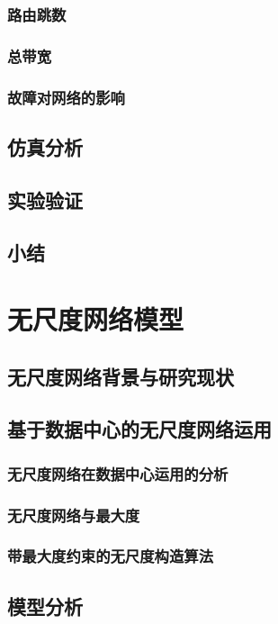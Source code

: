 \documentclass[master]{njuthesis}
\begin{document}
\subsection{路由跳数}
\Blindtext
\subsection{总带宽}
\Blindtext
\subsection{故障对网络的影响}
\Blindtext
\section{仿真分析}
\Blindtext
\section{实验验证}
\Blindtext
\section{小结}
\blindtext

\chapter{无尺度网络模型}\label{chapter_scalefree}
\section{无尺度网络背景与研究现状}
\Blindtext
\section{基于数据中心的无尺度网络运用}
\subsection{无尺度网络在数据中心运用的分析}
\Blindtext
\subsection{无尺度网络与最大度}
\Blindtext
\subsection{带最大度约束的无尺度构造算法}
\Blindtext
\section{模型分析}
\end{document}
